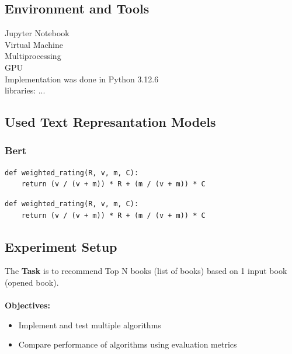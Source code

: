 \documentclass[\myFontSize,oneside,english,hidelinks,a4paper]{article}
\begin{document}
\subsection{Environment and Tools}
Jupyter Notebook\\
Virtual Machine\\
Multiprocessing\\
GPU\\
Implementation was done in Python 3.12.6\\
libraries: ...

\subsection{Used Text Represantation Models}




\subsubsection{Bert}
\begin{verbatim}
def weighted_rating(R, v, m, C):
    return (v / (v + m)) * R + (m / (v + m)) * C
\end{verbatim}



\begin{lstlisting}
def weighted_rating(R, v, m, C):
    return (v / (v + m)) * R + (m / (v + m)) * C
\end{lstlisting}



\subsection{Experiment Setup}
The \textbf{Task} is to recommend Top N books (list of books) based on 1 input book (opened book).\\\\
\textbf{Objectives:} 
\begin{itemize}
\item Implement and test multiple algorithms
\item Compare performance of algorithms using evaluation metrics
\end{itemize}
\end{document}
